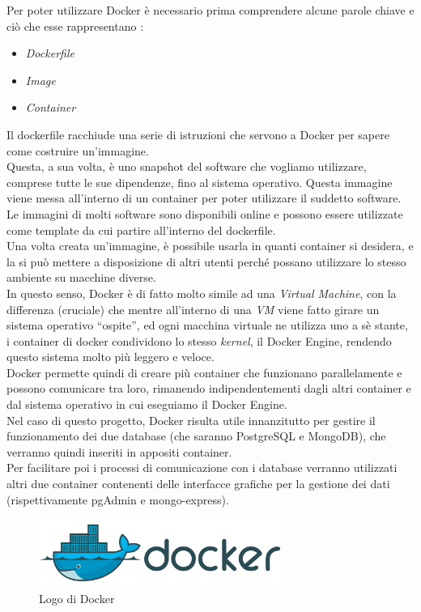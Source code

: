 \noindent Per poter utilizzare Docker è necessario prima comprendere alcune parole chiave e ciò che esse rappresentano \cite{site:fireshipdocker}:
\begin{itemize}
    \item \textit{Dockerfile}
    \item \textit{Image}
    \item \textit{Container}
\end{itemize}
Il dockerfile racchiude una serie di istruzioni che servono a Docker per sapere come costruire un'immagine.\\
Questa, a sua volta, è uno snapshot del software che vogliamo utilizzare, comprese tutte le sue dipendenze, fino al sistema operativo. Questa immagine viene messa all'interno di un container per poter utilizzare il suddetto software.\\
Le immagini di molti software sono disponibili online e possono essere utilizzate come template da cui partire all'interno del dockerfile.\\
Una volta creata un'immagine, è possibile usarla in quanti container si desidera, e la si può mettere a disposizione di altri utenti perché possano utilizzare lo stesso ambiente su macchine diverse.\\
In questo senso, Docker è di fatto molto simile ad una \textit{Virtual Machine}, con la differenza (cruciale) che mentre all'interno di una \textit{VM} viene fatto girare un sistema operativo ``ospite'', ed ogni macchina virtuale ne utilizza uno a sè stante, i container di docker condividono lo stesso \textit{kernel}, il Docker Engine, rendendo questo sistema molto più leggero e veloce.\\
Docker permette quindi di creare più container che funzionano parallelamente e possono comunicare tra loro, rimanendo indipendentementi dagli altri container e dal sistema operativo in cui eseguiamo il Docker Engine.\\

\noindent Nel caso di questo progetto, Docker risulta utile innanzitutto per gestire il funzionamento dei due database (che saranno PostgreSQL e MongoDB), che verranno quindi inseriti in appositi container.\\
Per facilitare poi i processi di comunicazione con i database verranno utilizzati altri due container contenenti delle interfacce grafiche per la gestione dei dati (rispettivamente pgAdmin e mongo-express).

\begin{figure}[htbp]
\begin{center}
\includegraphics[height=6em]{immagini/tecnologies-logos/Docker-Logo.png}
\caption{Logo di Docker}
\label{fig:docker}
\end{center}
\end{figure}

